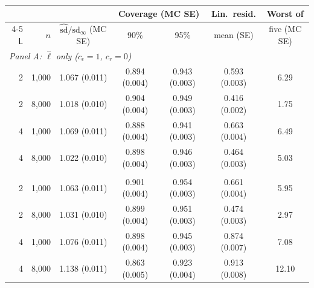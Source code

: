 \begin{tabular}{rrccccc}
\toprule
 & & & \multicolumn{2}{c}{Coverage (MC SE)} & Lin.\ resid. & Worst of \\
\cmidrule(lr){4-5}
$\mathsf L$ & $n$ & $\hat{\mathrm{sd}}/\mathrm{sd}_\infty$ (MC SE) & 90\% & 95\% & mean (SE) & five (MC SE) \\
\midrule
\multicolumn{7}{l}{\textit{Panel A: $\hat\ell$ only ($c_\epsilon=1$, $c_r=0$)}} \\
\midrule
2 & 1,000 & 1.067 (0.011) & 0.894 (0.004) & 0.943 (0.003) & 0.593 (0.003) & 6.29 \\
2 & 8,000 & 1.018 (0.010) & 0.904 (0.004) & 0.949 (0.003) & 0.416 (0.002) & 1.75 \\
4 & 1,000 & 1.069 (0.011) & 0.888 (0.004) & 0.941 (0.003) & 0.663 (0.004) & 6.49 \\
4 & 8,000 & 1.022 (0.010) & 0.898 (0.004) & 0.946 (0.003) & 0.464 (0.003) & 5.03 \\
\addlinespace
\multicolumn{7}{l}{\textit{Panel B: $\hat\varrho$ only ($c_\epsilon=0$, $c_r=1$)}} \\
\midrule
2 & 1,000 & 1.063 (0.011) & 0.901 (0.004) & 0.954 (0.003) & 0.661 (0.004) & 5.95 \\
2 & 8,000 & 1.031 (0.010) & 0.899 (0.004) & 0.951 (0.003) & 0.474 (0.003) & 2.97 \\
4 & 1,000 & 1.076 (0.011) & 0.898 (0.004) & 0.945 (0.003) & 0.874 (0.007) & 7.08 \\
4 & 8,000 & 1.138 (0.011) & 0.863 (0.005) & 0.923 (0.004) & 0.913 (0.008) & 12.10 \\
\bottomrule
\end{tabular}

